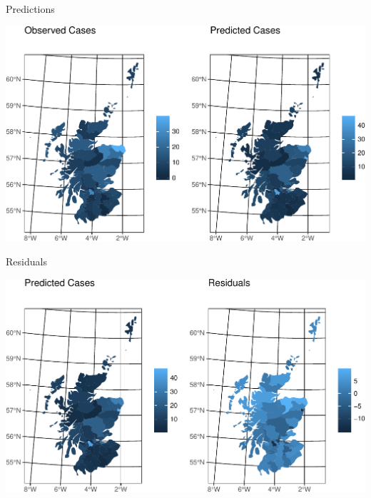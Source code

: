 \documentclass[11pt,ignorenonframetext,]{beamer}
\begin{document}
\begin{frame}{Predictions}
\protect\hypertarget{predictions-1}{}

\begin{center}\includegraphics[width=\textwidth]{Lec19_files/figure-beamer/unnamed-chunk-26-1} \end{center}

\end{frame}

\begin{frame}{Residuals}
\protect\hypertarget{residuals-1}{}

\begin{center}\includegraphics[width=\textwidth]{Lec19_files/figure-beamer/unnamed-chunk-27-1} \end{center}

\end{frame}
\end{document}
